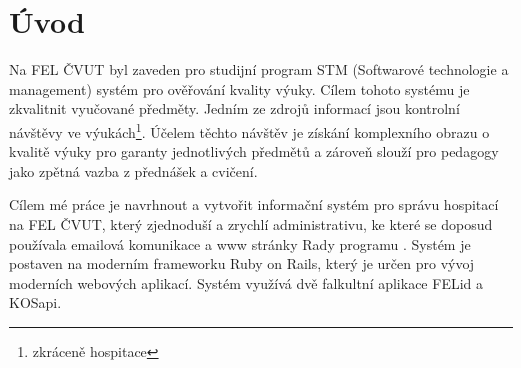 \chapter{Úvod}

Na FEL ČVUT byl zaveden pro studijní program STM (Softwarové technologie a management) systém pro ověřování kvality výuky. Cílem tohoto systému je zkvalitnit vyučované předměty. Jedním ze zdrojů informací jsou kontrolní návštěvy ve výukách\footnote{zkráceně hospitace}. Účelem těchto návštěv je získání komplexního obrazu o kvalitě výuky pro garanty jednotlivých předmětů a zároveň slouží pro pedagogy jako zpětná vazba z přednášek a cvičení.

Cílem mé práce je navrhnout a vytvořit informační systém pro správu hospitací na FEL ČVUT, který zjednoduší a zrychlí administrativu, ke které se doposud používala emailová komunikace a www stránky Rady programu \cite{kvalitavyukyweb}. Systém je postaven na moderním frameworku Ruby on Rails, který je určen pro vývoj moderních webových aplikací. Systém využívá dvě falkultní aplikace FELid a KOSapi.
